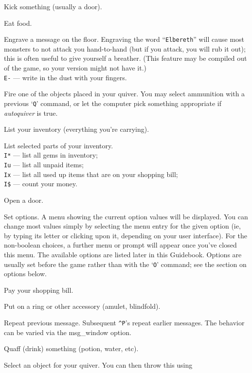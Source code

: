 Kick something (usually a door).
\item[\tb{e}]
Eat food.
\item[\tb{E}]
Engrave a message on the floor.
Engraving the word ``{\tt Elbereth}'' will cause most monsters to not attack
you hand-to-hand (but if you attack, you will rub it out); this is
often useful to give yourself a breather.  (This feature may be compiled out
of the game, so your version might not have it.)\\
{\tt E-} --- write in the dust with your fingers.
\item[\tb{f}]
Fire one of the objects placed in your quiver.  You may select
ammunition with a previous `{\tt Q}' command, or let the computer pick
something appropriate if {\it autoquiver\/} is true.
\item[\tb{i}]
List your inventory (everything you're carrying).
\item[\tb{I}]
List selected parts of your inventory.\\
{\tt I*} --- list all gems in inventory;\\
{\tt Iu} --- list all unpaid items;\\
{\tt Ix} --- list all used up items that are on your shopping bill;\\
{\tt I\$} --- count your money.
\item[\tb{o}]
Open a door.
\item[\tb{O}]
Set options.  A menu showing the current option values will be
displayed.  You can change most values simply by selecting the menu
entry for the given option (ie, by typing its letter or clicking upon
it, depending on your user interface).  For the non-boolean choices,
a further menu or prompt will appear once you've closed this menu.
The available options
are listed later in this Guidebook.  Options are usually set before the
game rather than with the `{\tt O}' command; see the section on options below.
\item[\tb{p}]
Pay your shopping bill.
\item[\tb{P}]
Put on a ring or other accessory (amulet, blindfold).
\item[\tb{\^{}P}]
Repeat previous message.  Subsequent {\tt \^{}P}'s repeat earlier messages.
The behavior can be varied via the msg_window option.
\item[\tb{q}]
Quaff (drink) something (potion, water, etc).
\item[\tb{Q}]
Select an object for your quiver.  You can then throw this using

